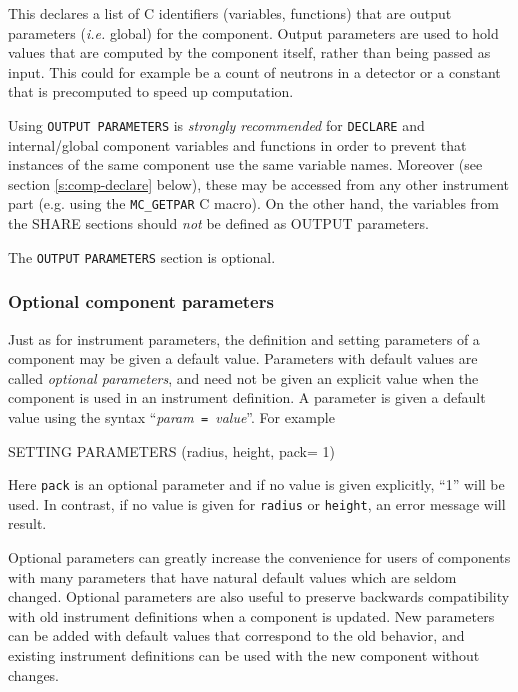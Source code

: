 This declares a list of C identifiers (variables, functions) that are
output parameters (\textit{i.e.} global) for the
component. Output parameters are used to hold values that are computed
by the component itself, rather than being passed as input. This could
for example be a count of neutrons in a detector or a constant that is
precomputed to speed up computation.

Using \texttt{OUTPUT PARAMETERS} is \emph{strongly recommended} for
\texttt{DECLARE} and internal/global component variables and functions in order
to prevent that instances of the same component use the same variable
names. Moreover (see section \ref{s:comp-declare} below), these may be accessed
from any other instrument part (e.g. using the \verb+MC_GETPAR+ C macro).  On
the other hand, the variables from the SHARE sections should \emph{not} be
defined as OUTPUT parameters.

The \texttt{OUTPUT} \texttt{PARAMETERS} section is optional.

\subsubsection{Optional component parameters}

Just as for instrument parameters, the definition and setting parameters of a
component may be given a default value. Parameters with default values are
called \emph{optional parameters}, and need not be given an explicit value when
the component is used in an instrument definition. A parameter is given a
default value using the syntax ``\textit{param}\texttt{ = }\textit{value}''.
For example
\begin{mcstas}
SETTING PARAMETERS (radius, height, pack= 1)
\end{mcstas}
Here \verb+pack+ is an optional parameter and if no value is given
explicitly, ``1'' will be used. In contrast, if no value is
  given for \texttt{radius} or \texttt{height}, an error message will
  result.

  Optional parameters can greatly increase the convenience for users of
  components with many parameters that have natural default values which are
  seldom changed. Optional parameters are also useful to preserve backwards
  compatibility with old instrument definitions when a component is updated. New
  parameters can be added with default values that correspond to the old
  behavior, and existing instrument definitions can be used with the new
  component without changes.

